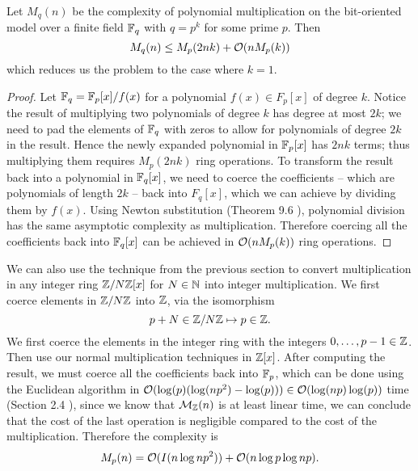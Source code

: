 \begin{lemma}
    Let $M_q(n)$ be the complexity of polynomial multiplication on the bit-oriented model over a finite field ${\mathbb F}_q$ with $q = p^k$ for some prime $p$. Then
    \[
        M_q(n) \leq M_p(2nk) + \mathcal O(n M_p(k))
    \]
    which reduces us the problem to the case where $k = 1$.
\end{lemma}

\begin{proof}
    Let ${\mathbb F}_q = {\mathbb F}_p[x] / f(x)$ for a polynomial $f(x) \in F_p[x]$ of degree $k$. Notice the result of multiplying two polynomials of degree $k$ has degree at most $2k$; we need to pad the elements of ${\mathbb F}_q$ with zeros to allow for polynomials of degree $2k$ in the result. Hence the newly expanded polynomial in ${\mathbb F}_p[x]$ has $2nk$ terms; thus multiplying them requires $M_p(2nk)$ ring operations. To transform the result back into a polynomial in ${\mathbb F}_q[x]$, we need to coerce the coefficients -- which are polynomials of length $2k$ -- back into $F_q[x]$, which we can achieve by dividing them by $f(x)$. Using Newton substitution (Theorem 9.6 \cite{modern-comp-alg}), polynomial division has the same asymptotic complexity as multiplication. Therefore coercing all the coefficients back into ${\mathbb F}_q[x]$ can be achieved in $\mathcal O(n M_p(k))$ ring operations.
\end{proof}

We can also use the technique from the previous section to convert multiplication in any integer ring ${\mathbb Z}/N{\mathbb Z}[x]$ for $N \in {\mathbb N}$ into integer multiplication. We first coerce elements in ${\mathbb Z}/N{\mathbb Z}$ into ${\mathbb Z}$, via the isomorphism
\[
    p + N \in {\mathbb Z}/N{\mathbb Z} \mapsto p \in {\mathbb Z}.
\]
We first coerce the elements in the integer ring with the integers $0,\ldots, p-1 \in {\mathbb Z}$. Then use our normal multiplication techniques in ${\mathbb Z}[x]$. After computing the result, we must coerce all the coefficients back into ${\mathbb F}_p$, which can be done using the Euclidean algorithm in $\mathcal O(\log(p)(\log(np^2) - \log (p))) \in \mathcal O(\log (np)\log (p))$ time (Section 2.4 \cite{modern-comp-alg}), since we know that $\mathcal M_{\mathbb Z}(n)$ is at least linear time, we can conclude that the cost of the last operation is negligible compared to the cost of the multiplication. Therefore the complexity is
\[
    M_p(n) = \mathcal O(I(n \log np^2)) + \mathcal O(n \log p \log np).
\]
